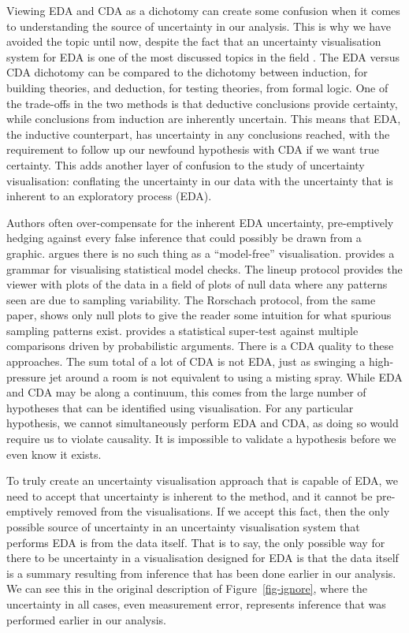 \documentclass[]{ar-1col-S2O}
\begin{document}
Viewing EDA and CDA as a dichotomy can create some confusion when it
comes to understanding the source of uncertainty in our analysis. This
is why we have avoided the topic until now, despite the fact that an
uncertainty visualisation system for EDA is one of the most discussed
topics in the field
\citep{Hadjimichael2024, geointerviews, MacEachren2005, Sarma2024, Griethe2006}.
The EDA versus CDA dichotomy can be compared to the dichotomy between
induction, for building theories, and deduction, for testing theories,
from formal logic. One of the trade-offs in the two methods is that
deductive conclusions provide certainty, while conclusions from
induction are inherently uncertain. This means that EDA, the inductive
counterpart, has uncertainty in any conclusions reached, with the
requirement to follow up our newfound hypothesis with CDA if we want
true certainty. This adds another layer of confusion to the study of
uncertainty visualisation: conflating the uncertainty in our data with
the uncertainty that is inherent to an exploratory process (EDA).

Authors often over-compensate for the inherent EDA uncertainty,
pre-emptively hedging against every false inference that could possibly
be drawn from a graphic. \citet{Hullman2021} argues there is no such
thing as a ``model-free'' visualisation. \citet{Guo2024} provides a
grammar for visualising statistical model checks. The lineup protocol
\citep{Buja2009} provides the viewer with plots of the data in a field
of plots of null data where any patterns seen are due to sampling
variability. The Rorschach protocol, from the same paper, shows only
null plots to give the reader some intuition for what spurious sampling
patterns exist. \citet{Savvides2019} provides a statistical super-test
against multiple comparisons driven by probabilistic arguments. There is
a CDA quality to these approaches. The sum total of a lot of CDA is not
EDA, just as swinging a high-pressure jet around a room is not
equivalent to using a misting spray. While EDA and CDA may be along a
continuum, this comes from the large number of hypotheses that can be
identified using visualisation. For any particular hypothesis, we cannot
simultaneously perform EDA and CDA, as doing so would require us to
violate causality. It is impossible to validate a hypothesis before we
even know it exists.

To truly create an uncertainty visualisation approach that is capable of
EDA, we need to accept that uncertainty is inherent to the method, and
it cannot be pre-emptively removed from the visualisations. If we accept
this fact, then the only possible source of uncertainty in an
uncertainty visualisation system that performs EDA is from the data
itself. That is to say, the only possible way for there to be
uncertainty in a visualisation designed for EDA is that the data itself
is a summary resulting from inference that has been done earlier in our
analysis. We can see this in the original description of
Figure~\ref{fig-ignore}, where the uncertainty in all cases, even
measurement error, represents inference that was performed earlier in
our analysis.
\end{document}
